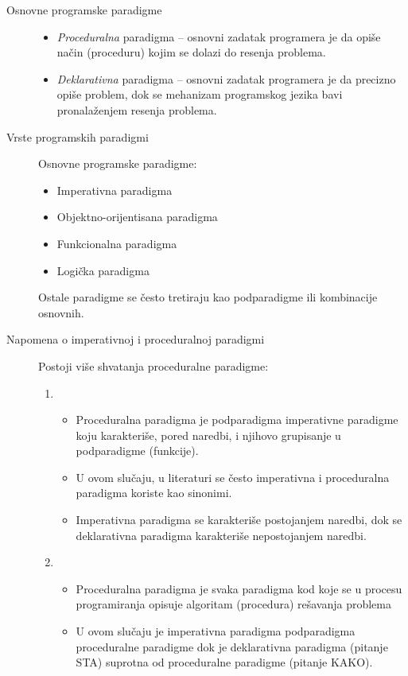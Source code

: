 \documentclass[../main.tex]{subfiles}
\begin{document}
\begin{description}
	\item[Osnovne programske paradigme] \hfill
		\begin{itemize}
			\item {\it Proceduralna} paradigma -- osnovni zadatak programera je da opiše način (proceduru) kojim se dolazi do resenja problema.
			\item {\it Deklarativna} paradigma -- osnovni zadatak programera je da precizno opiše problem, dok se mehanizam programskog jezika bavi pronalaženjem resenja problema.
		\end{itemize}
	\item[Vrste programskih paradigmi] \hfill
	
		Osnovne programske paradigme:
		\begin{itemize}
			 \item Imperativna paradigma
			 \item Objektno-orijentisana paradigma
			 \item Funkcionalna paradigma
			 \item Logička paradigma
		\end{itemize}
		 Ostale paradigme se često tretiraju kao podparadigme ili kombinacije osnovnih.

	\item[Napomena o imperativnoj i proceduralnoj paradigmi] \hfill 

		Postoji više shvatanja proceduralne paradigme:
			\begin{enumerate}
				\item   \begin{itemize}
						\item Proceduralna paradigma je podparadigma imperativne paradigme koju karakteriše, pored naredbi, i njihovo grupisanje u podparadigme (funkcije).
						\item U ovom slučaju, u literaturi se često imperativna i proceduralna paradigma koriste kao sinonimi.
						\item Imperativna paradigma se karakteriše postojanjem naredbi, dok se deklarativna paradigma karakteriše nepostojanjem naredbi.
					\end{itemize}
				\item  	\begin{itemize}
						\item Proceduralna paradigma je svaka paradigma kod koje se u procesu programiranja opisuje algoritam (procedura) rešavanja problema
						\item U ovom slučaju je imperativna paradigma podparadigma proceduralne paradigme dok je deklarativna paradigma (pitanje STA) suprotna od proceduralne paradigme (pitanje KAKO).
					\end{itemize}
			\end{enumerate}


\end{description}
\end{document}
